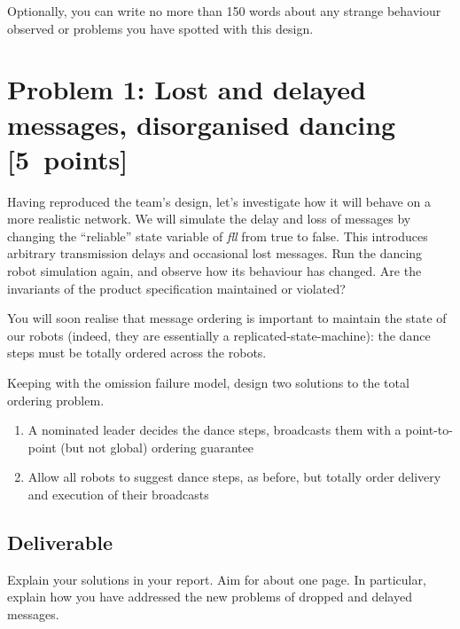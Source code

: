 \documentclass[a4paper]{article}
\begin{document}
Optionally, you can write no more than 150 words about any strange behaviour
observed or problems you have spotted with this design.





\section*{Problem 1: Lost and delayed messages, disorganised dancing [5~points]} %
\label{sec:dealing_with_unreliable_links}

Having reproduced the team's design, let's investigate how it will behave on
a more realistic network. We will simulate the delay and loss of messages by
changing the ``reliable'' state variable of \emph{fll} from true to false.
This introduces arbitrary transmission delays and occasional lost messages.
Run the dancing robot  simulation again, and observe how its behaviour has
changed. Are the invariants of the product specification maintained or
violated?

You will soon realise that message ordering is important to maintain the state
of our robots (indeed, they are essentially a replicated-state-machine): the
dance steps must be totally ordered across the robots.

Keeping with the omission failure model, design two solutions to the total
ordering problem.
\begin{enumerate}

  \item A nominated leader decides the dance steps, broadcasts them with a
  point-to-point (but not global) ordering guarantee

  \item Allow all robots to suggest dance steps, as before, but totally order
  delivery and execution of their broadcasts

\end{enumerate}

\subsection*{Deliverable} %
\label{sub:p1_deliverable}

Explain your solutions in your report. Aim for about one page.
In particular, explain how you have addressed the new
problems of dropped and delayed messages.
\end{document}
